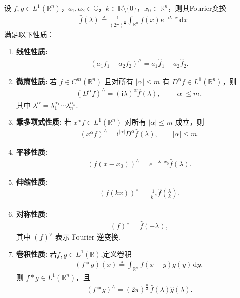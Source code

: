\documentclass[../../main.tex]{subfiles}%
\begin{document}
\begin{proposition}\label{proposition:Fourier 变换的基本性质2}
设 $f,g\in L^1(\mathbb{R}^n)$，$a_1,a_2\in\mathbb{C}$，$k\in\mathbb{R}\setminus\{0\}$，$x_0\in\mathbb{R}^n$，则其Fourier变换
\begin{align*}
\hat{f}(\lambda)\triangleq \frac{1}{(2\pi)^{\frac{n}{2}}}\int_{\mathbb{R}^n} f(x)e^{-\mathrm{i}\lambda\cdot x}\,\mathrm{d}x
\end{align*}
满足以下性质：
\begin{enumerate}[(1)]
\item \textbf{线性性质:}
\begin{align*}
(a_1f_1+a_2f_2)^\wedge=a_1\hat{f}_1+a_2\hat{f}_2.
\end{align*}

\item\label{proposition:Fourier 变换的基本性质2-2} \textbf{微商性质:} 若 $f\in C^m(\mathbb{R}^n)$ 且对所有 $|\alpha|\leqslant m$ 有 $D^\alpha f\in L^1(\mathbb{R}^n)$，则
\begin{align*}
(D^\alpha f)^\wedge=(\mathrm{i}\lambda)^\alpha \hat{f}(\lambda),\qquad |\alpha|\leqslant m,
\end{align*}
其中 $\lambda^\alpha=\lambda_1^{\alpha_1}\cdots\lambda_n^{\alpha_n}$.

\item \textbf{乘多项式性质:} 若 $x^\alpha f\in L^1(\mathbb{R}^n)$ 对所有 $|\alpha|\leqslant m$ 成立，则
\begin{align*}
(x^\alpha f)^\wedge=\mathrm{i}^{|\alpha|}D^\alpha \hat{f}(\lambda),\qquad |\alpha|\leqslant m.
\end{align*}

\item \textbf{平移性质:}
\begin{align*}
(f(x-x_0))^\wedge=e^{-\mathrm{i}\lambda\cdot x_0}\hat{f}(\lambda).
\end{align*}

\item \textbf{伸缩性质:}
\begin{align*}
(f(kx))^\wedge=\frac{1}{|k|^n}\hat{f}\left(\frac{\lambda}{k}\right).
\end{align*}

\item \textbf{对称性质:}
\begin{align*}
(f)^\vee=\hat{f}(-\lambda),
\end{align*}
其中 $(f)^\vee$ 表示 Fourier 逆变换.

\item \textbf{卷积性质:} 若$f,g\in L^1(\mathbb{R})$,定义卷积
\begin{align*}
(f*g)(x)\triangleq\int_{\mathbb{R}^n} f(x-y)g(y)\,\mathrm{d}y,
\end{align*}
则 $f*g\in L^1(\mathbb{R}^n)$，且
\begin{align*}
(f*g)^\wedge=(2\pi)^{\frac{n}{2}}\,\hat{f}(\lambda)\hat{g}(\lambda).
\end{align*}


\end{enumerate}
\end{proposition}
\end{document}
